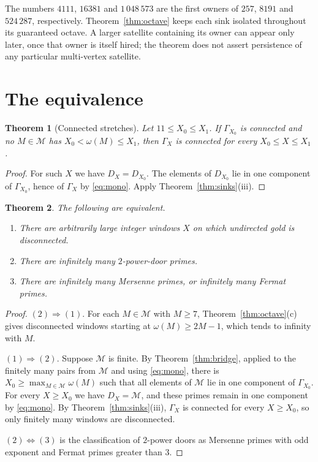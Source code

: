 \documentclass[11pt,a4paper]{article}
\newtheorem{theorem}{Theorem}[section]
\theoremstyle{remark}
\newcommand{\pow}{\mathcal{M}}   %
\begin{document}
The numbers \(4111\), \(16381\) and \(1\,048\,573\) are the first owners of \(257\), \(8191\) and \(524\,287\), respectively.
Theorem~\ref{thm:octave} keeps each sink isolated throughout its guaranteed octave. A larger satellite containing its owner can appear only later, once that owner is itself hired; the theorem does not assert persistence of any particular multi-vertex satellite.

\section{The equivalence}\label{sec:equiv}

\begin{theorem}[Connected stretches]\label{thm:stretch}
Let \(11\le X_0\le X_1\).
If \(\Gamma_{X_0}\) is connected and no \(M\in\pow\) has \(X_0<\omega(M)\le X_1\), then \(\Gamma_X\) is connected for every \(X_0\le X\le X_1\).
\end{theorem}
\begin{proof}
For such \(X\) we have \(D_X=D_{X_0}\).
The elements of \(D_{X_0}\) lie in one component of \(\Gamma_{X_0}\), hence of \(\Gamma_X\) by \eqref{eq:mono}.
Apply Theorem~\ref{thm:sinks}(iii).
\end{proof}

\begin{theorem}\label{thm:equiv}
The following are equivalent.
\begin{enumerate}
\item There are arbitrarily large integer windows \(X\) on which undirected gold is disconnected.
\item There are infinitely many \(2\)-power-door primes.
\item There are infinitely many Mersenne primes, or infinitely many Fermat primes.
\end{enumerate}
\end{theorem}
\begin{proof}
\((2)\Rightarrow(1)\).
For each \(M\in\pow\) with \(M\ge 7\), Theorem~\ref{thm:octave}(c) gives disconnected windows starting at \(\omega(M)\ge 2M-1\), which tends to infinity with \(M\).

\((1)\Rightarrow(2)\).
Suppose \(\pow\) is finite.
By Theorem~\ref{thm:bridge}, applied to the finitely many pairs from \(\pow\) and using \eqref{eq:mono}, there is \(X_0\ge\max_{M\in\pow}\omega(M)\) such that all elements of \(\pow\) lie in one component of \(\Gamma_{X_0}\).
For every \(X\ge X_0\) we have \(D_X=\pow\), and these primes remain in one component by \eqref{eq:mono}.
By Theorem~\ref{thm:sinks}(iii), \(\Gamma_X\) is connected for every \(X\ge X_0\), so only finitely many windows are disconnected.

\((2)\Leftrightarrow(3)\) is the classification of \(2\)-power doors as Mersenne primes with odd exponent and Fermat primes greater than \(3\).
\end{proof}
\end{document}
